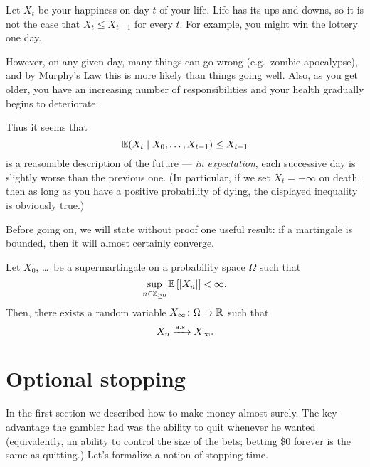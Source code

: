 \begin{example}

	Let $X_t$ be your happiness on day $t$ of your life.
	Life has its ups and downs,
	so it is not the case that $X_t \le X_{t-1}$ for every $t$.
	For example, you might win the lottery one day.

	However, on any given day, many things can go wrong (e.g.\ zombie apocalypse),
	and by Murphy's Law this is more likely than things going well.
	Also, as you get older, you have an increasing number of responsibilities
	and your health gradually begins to deteriorate.

	Thus it seems that
	\[ \mathbb E(X_t \mid X_0, \dots, X_{t-1}) \le X_{t-1} \]
	is a reasonable description of the future ---
	\emph{in expectation}, each successive day is
	slightly worse than the previous one.
	(In particular, if we set $X_t = -\infty$ on death,
	then as long as you have a positive probability of dying,
	the displayed inequality is obviously true.)
\end{example}

Before going on, we will state without proof one useful result:
if a martingale is bounded, then it will almost certainly converge.

\begin{theorem}
	\label{thm:doob_martingale_converge}
	Let $X_0$, \dots\ be a supermartingale on a
	probability space $\Omega$ such that
	\[ \sup_{n \in \mathbb Z_{\ge 0}}
		\mathbb E \left[ \left\lvert X_n \right\rvert \right] < \infty. \]
	Then, there exists a random variable $X_\infty \colon \Omega \to \mathbb R$
	such that
	\[ X_n \xrightarrow{\text{a.s.}} X_\infty. \]
\end{theorem}

\section{Optional stopping}

In the first section we described how to make money almost surely.
The key advantage the gambler had was the ability to quit whenever he wanted
(equivalently, an ability to control the size of the bets;
betting \$0 forever is the same as quitting.)
Let's formalize a notion of stopping time.

